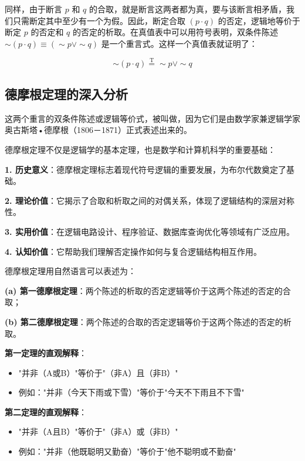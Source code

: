 同样，由于断言 $p$ 和 $q$ 的合取，就是断言这两者都为真，要与该断言相矛盾，我们只需断定其中至少有一个为假。因此，断定合取 $(p \cdot q)$ 的否定，逻辑地等价于断定 $p$ 的否定和 $q$ 的否定的析取。在真值表中可以用符号表明，双条件陈述 $\sim(p \cdot q) \equiv(\sim p \vee \sim q)$ 是一个重言式。这样一个真值表就证明了：

$$
\sim(p \cdot q) \stackrel{\mathrm{T}}{=} \sim p \vee \sim q
$$

\subsection{德摩根定理的深入分析}

这两个重言的双条件陈述或逻辑等价式，被叫做，因为它们是由数学家兼逻辑学家奥古斯塔•德摩根（1806－1871）正式表述出来的。

\begin{theorembox}[title=德摩根定理的历史意义与理论价值]
德摩根定理不仅是逻辑学的基本定理，也是数学和计算机科学的重要基础：

\textbf{1. 历史意义}：德摩根定理标志着现代符号逻辑的重要发展，为布尔代数奠定了基础。

\textbf{2. 理论价值}：它揭示了合取和析取之间的对偶关系，体现了逻辑结构的深层对称性。

\textbf{3. 实用价值}：在逻辑电路设计、程序验证、数据库查询优化等领域有广泛应用。

\textbf{4. 认知价值}：它帮助我们理解否定操作如何与复合逻辑结构相互作用。
\end{theorembox}

德摩根定理用自然语言可以表述为：

\textbf{(a) 第一德摩根定理}：两个陈述的析取的否定逻辑等价于这两个陈述的否定的合取；

\textbf{(b) 第二德摩根定理}：两个陈述的合取的否定逻辑等价于这两个陈述的否定的析取。

\begin{examplebox}[title=德摩根定理的直观理解]
\textbf{第一定理的直观解释}：
\begin{itemize}
\item "并非（A或B）"等价于"（非A）且（非B）"
\item 例如："并非（今天下雨或下雪）"等价于"今天不下雨且不下雪"
\end{itemize}

\textbf{第二定理的直观解释}：
\begin{itemize}
\item "并非（A且B）"等价于"（非A）或（非B）"
\item 例如："并非（他既聪明又勤奋）"等价于"他不聪明或不勤奋"
\end{itemize}
\end{examplebox}

